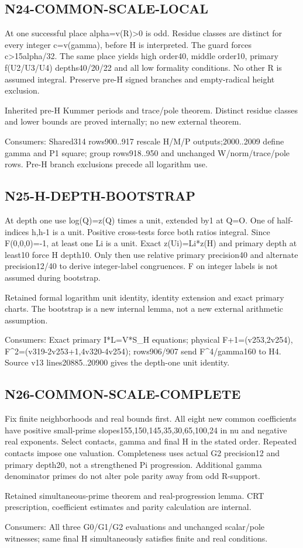 \documentclass{article}
\begin{document}
\subsection{N24-COMMON-SCALE-LOCAL}
\label{outline:r4-n24-common-scale-local}
At one successful place alpha=v(R)>0 is odd. Residue classes are distinct for every integer c=v(gamma), before H is interpreted. The guard forces c>15alpha/32. The same place yields high order40, middle order10, primary f(U2/U3/U4) depths40/20/22 and all low formality conditions. No other R is assumed integral. Preserve pre-H signed branches and empty-radical height exclusion.
\par Inherited pre-H Kummer periods and trace/pole theorem. Distinct residue classes and lower bounds are proved internally; no new external theorem.
\par Consumers: Shared314 rows900..917 rescale H/M/P outputs;2000..2009 define gamma and P1 square; group rows918..950 and unchanged W/norm/trace/pole rows. Pre-H branch exclusions precede all logarithm use.
\subsection{N25-H-DEPTH-BOOTSTRAP}
\label{outline:r4-n25-h-depth-bootstrap}
At depth one use log(Q)=z(Q) times a unit, extended by1 at Q=O. One of half-indices h,h-1 is a unit. Positive cross-tests force both ratios integral. Since F(0,0,0)=-1, at least one Li is a unit. Exact z(Ui)=Li*z(H) and primary depth at least10 force H depth10. Only then use relative primary precision40 and alternate precision12/40 to derive integer-label congruences. F on integer labels is not assumed during bootstrap.
\par Retained formal logarithm unit identity, identity extension and exact primary charts. The bootstrap is a new internal lemma, not a new external arithmetic assumption.
\par Consumers: Exact primary I*L=V*S\_H equations; physical F+1=(v253,2v254), F\textasciicircum{}2=(v319-2v253+1,4v320-4v254); rows906/907 send F\textasciicircum{}4/gamma160 to H4. Source v13 lines20885..20900 gives the depth-one unit identity.
\subsection{N26-COMMON-SCALE-COMPLETE}
\label{outline:r4-n26-common-scale-complete}
Fix finite neighborhoods and real bounds first. All eight new common coefficients have positive small-prime slopes155,150,145,35,30,65,100,24 in nu and negative real exponents. Select contacts, gamma and final H in the stated order. Repeated contacts impose one valuation. Completeness uses actual G2 precision12 and primary depth20, not a strengthened Pi progression. Additional gamma denominator primes do not alter pole parity away from odd R-support.
\par Retained simultaneous-prime theorem and real-progression lemma. CRT prescription, coefficient estimates and parity calculation are internal.
\par Consumers: All three G0/G1/G2 evaluations and unchanged scalar/pole witnesses; same final H simultaneously satisfies finite and real conditions.
\end{document}
